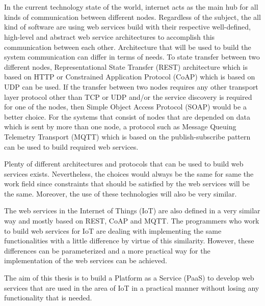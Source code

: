\chapter{\abstractname}



In the current technology state of the world, internet acts as the main hub for all kinds of communication between different nodes. Regardless of the subject, the all kind of software are using web services build with their respective well-defined, high-level and abstract web service architectures to accomplish this communication between each other. Architecture that will be used to build the system communication can differ in terms of needs. To state transfer between two different nodes, Representational State Transfer (REST) architecture which is based on HTTP or Constrained Application Protocol (CoAP) which is based on UDP can be used. If the transfer between two nodes requires any other transport layer protocol other than TCP or UDP and/or the service discovery is required for one of the nodes, then Simple Object Access Protocol (SOAP) would be a better choice. For the systems that consist of nodes that are depended on data which is sent by more than one node, a protocol such as Message Queuing Telemetry Transport (MQTT) which is based on the publish-subscribe pattern can be used to build required web services.

Plenty of different architectures and protocols that can be used to build web services exists. Nevertheless, the choices would always be the same for same the work field since constraints that should be satisfied by the web services will be the same. Moreover, the use of these technologies will also be very similar.

The web services in the Internet of Things (IoT) are also defined in a very similar way and mostly based on REST, CoAP and MQTT. The programmers who work to build web services for IoT are dealing with implementing the same functionalities with a little difference by virtue of this similarity. However, these differences can be parameterized and a more practical way for the implementation of the web services can be achieved.

The aim of this thesis is to build a Platform as a Service (PaaS) to develop web services that are used in the area of IoT in a practical manner without losing any functionality that is needed.